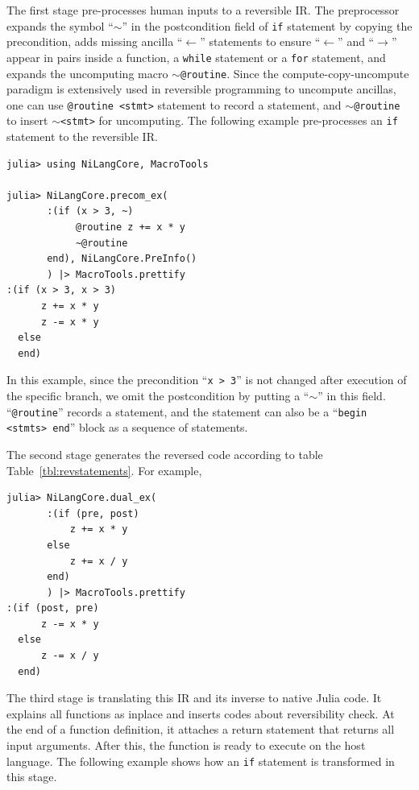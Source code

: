 \documentclass{article}
\newcommand{\<}{\langle}
\renewcommand{\>}{\rangle}
\newcommand{\Tbl}[1]{Table~\ref{#1}}
\theoremstyle{definition}\newtheorem{definition}{\textit{Definition}}
\begin{document}
The first stage pre-processes human inputs to a reversible IR.
The preprocessor expands the symbol ``\texttt{$\sim$}'' in the postcondition field of \texttt{if} statement by copying the precondition, adds missing ancilla ``$\leftarrow$'' statements to ensure ``\texttt{$\leftarrow$}'' and ``\texttt{$\rightarrow$}'' appear in pairs inside a function, a \texttt{while} statement or a \texttt{for} statement, and expands the uncomputing macro \texttt{$\sim$@routine}.
Since the compute-copy-uncompute paradigm is extensively used in reversible programming to uncompute ancillas, one can use \texttt{@routine <stmt>} statement to record a statement, and \texttt{$\sim$@routine} to insert \texttt{$\sim$<stmt>} for uncomputing.
The following example pre-processes an \texttt{if} statement to the reversible IR.

\begin{minipage}{.88\columnwidth}
\begin{lstlisting}
julia> using NiLangCore, MacroTools

julia> NiLangCore.precom_ex(
       :(if (x > 3, ~)
            @routine z += x * y
            ~@routine
       end), NiLangCore.PreInfo()
       ) |> MacroTools.prettify
:(if (x > 3, x > 3)
      z += x * y
      z -= x * y
  else
  end)
\end{lstlisting}
\end{minipage}

In this example, since the precondition ``\texttt{x > 3}'' is not changed after execution of the specific branch, we omit the postcondition by putting a ``$\sim$'' in this field. ``\texttt{@routine}'' records a statement, and the statement can also be a ``\texttt{begin <stmts> end}'' block as a sequence of statements.

The second stage generates the reversed code according to table \Tbl{tbl:revstatements}. For example,

\begin{minipage}{.88\columnwidth}
\begin{lstlisting}
julia> NiLangCore.dual_ex(
       :(if (pre, post)
           z += x * y
       else
           z += x / y
       end)
       ) |> MacroTools.prettify
:(if (post, pre)
      z -= x * y
  else
      z -= x / y
  end)
\end{lstlisting}
\end{minipage}

The third stage is translating this IR and its inverse to native Julia code. It explains all functions as inplace and inserts codes about reversibility check. At the end of a function definition, it attaches a return statement that returns all input arguments.
After this, the function is ready to execute on the host language.
The following example shows how an \texttt{if} statement is transformed in this stage.
\end{document}
